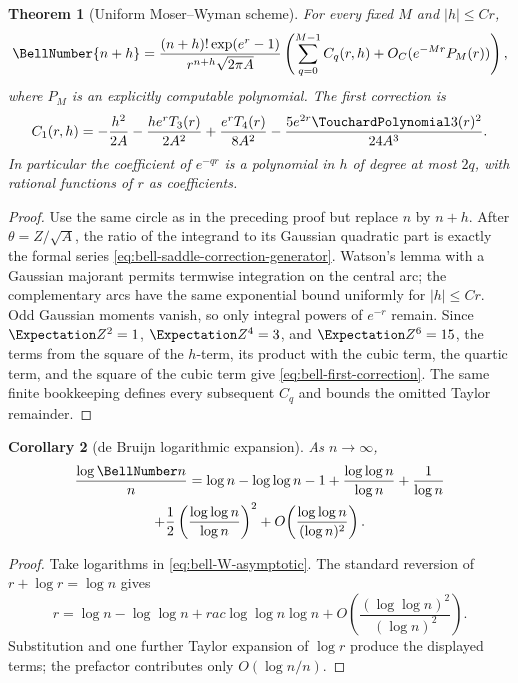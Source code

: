 \documentclass[11pt,a4paper,oneside,openany]{book}
\newtheorem{theorem}{Theorem}[chapter]
\newtheorem{corollary}[theorem]{Corollary}
\theoremstyle{definition}
\theoremstyle{remark}
\begin{document}
\begin{theorem}[Uniform Moser--Wyman scheme]\label{thm:bell-refined-saddle}
For every fixed $M$ and $|h|\le Cr$,
\begin{equation}\label{eq:bell-refined-saddle}
 \BellNumber{n+h}=\frac{(n+h)!\exp(e^r-1)}{r^{n+h}\sqrt{2\pi A}}
 \left(\sum_{q=0}^{M-1}C_q(r,h)+O_C(e^{-Mr}P_M(r))\right),
\end{equation}
where $P_M$ is an explicitly computable polynomial.  The first correction is
\begin{equation}\label{eq:bell-first-correction}
 C_1(r,h)=
 -\frac{h^2}{2A}-\frac{h e^rT_3(r)}{2A^2}
 +\frac{e^rT_4(r)}{8A^2}
 -\frac{5e^{2r}\TouchardPolynomial3(r)^2}{24A^3}.
\end{equation}
In particular the coefficient of $e^{-qr}$ is a polynomial in $h$ of degree at
most $2q$, with rational functions of $r$ as coefficients.
\end{theorem}
\begin{proof}
Use the same circle as in the preceding proof but replace $n$ by $n+h$.  After
$\theta=Z/\sqrt A$, the ratio of the integrand to its Gaussian quadratic part is
exactly the formal series \eqref{eq:bell-saddle-correction-generator}.  Watson's
lemma with a Gaussian majorant permits termwise integration on the central arc;
the complementary arcs have the same exponential bound uniformly for
$|h|\le Cr$.  Odd Gaussian moments vanish, so only integral powers of $e^{-r}$
remain.  Since $\Expectation Z^2=1$, $\Expectation Z^4=3$, and $\Expectation Z^6=15$, the terms from the square
of the $h$-term, its product with the cubic term, the quartic term, and the square
of the cubic term give \eqref{eq:bell-first-correction}.  The same finite
bookkeeping defines every subsequent $C_q$ and bounds the omitted Taylor
remainder.
\end{proof}

\begin{corollary}[de Bruijn logarithmic expansion]\label{cor:bell-debruijn}
As $n\to\infty$,
\begin{multline}\label{eq:bell-debruijn}
 \frac{\log\BellNumber n}{n}
 =\log n-\log\log n-1
 +\frac{\log\log n}{\log n}+\frac1{\log n}\\
 +\frac12\left(\frac{\log\log n}{\log n}\right)^2
 +O\!\left(\frac{\log\log n}{(\log n)^2}\right).
\end{multline}
\end{corollary}
\begin{proof}
Take logarithms in \eqref{eq:bell-W-asymptotic}.  The standard reversion of
$r+\log r=\log n$ gives
\[
 r=\log n-\log\log n+
rac{\log\log n}{\log n}
 +O\!\left(\frac{(\log\log n)^2}{(\log n)^2}\right).
\]
Substitution and one further Taylor expansion of $\log r$ produce the displayed
terms; the prefactor contributes only $O(\log n/n)$.
\end{proof}
\end{document}
